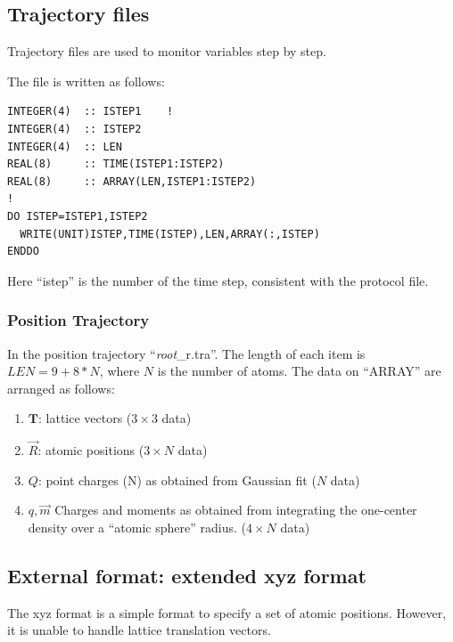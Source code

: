 \documentclass[final,12pt,makeidx,DIV=calc]{article}
\begin{document}
{{{{{{%
\subsection{Trajectory files}
Trajectory files are used to monitor variables step by step. 

The file is written as follows:
\begin{verbatim}
INTEGER(4)  :: ISTEP1    !
INTEGER(4)  :: ISTEP2
INTEGER(4)  :: LEN
REAL(8)     :: TIME(ISTEP1:ISTEP2)
REAL(8)     :: ARRAY(LEN,ISTEP1:ISTEP2)
!
DO ISTEP=ISTEP1,ISTEP2
  WRITE(UNIT)ISTEP,TIME(ISTEP),LEN,ARRAY(:,ISTEP)
ENDDO
\end{verbatim}

Here ``istep'' is the number of the time step, consistent with the
protocol file. 

\subsubsection{Position Trajectory}
In the position trajectory ``{\it root}\_r.tra''. The length of each
item is $LEN=9+8*N$, where $N$ is the number of atoms. The data on
``ARRAY'' are arranged as follows:
\begin{enumerate}
\item $\mathbf{T}$: lattice vectors ($3\times3$ data)
\item $\vec{R}$: atomic positions ($3\times N$ data)
\item $Q$: point charges (N) as obtained from Gaussian fit ($N$ data)
\item $q,\vec{m}$ Charges and moments as obtained from integrating the
  one-center density over a ``atomic sphere'' radius. ($4\times N$ data)
\end{enumerate}


\subsection{External format: extended xyz format}
The xyz format is a simple format to specify a set of atomic
positions. However, it is unable to handle lattice translation
vectors.

}}}}}}
\end{document}
